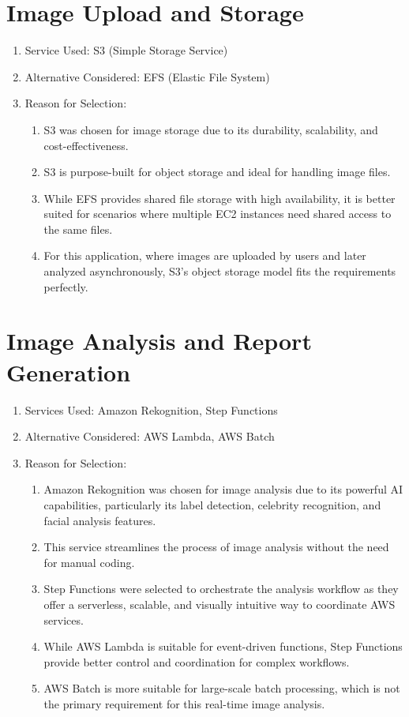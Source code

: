 \section{Image Upload and Storage}
\begin{enumerate}
    \item Service Used: S3 (Simple Storage Service)
    \item Alternative Considered: EFS (Elastic File System)
    \item Reason for Selection: 
    \begin{enumerate}
        \item S3 was chosen for image storage due to its durability, scalability, and cost-effectiveness. 
        \item S3 is purpose-built for object storage and ideal for handling image files. 
        \item  While EFS provides shared file storage with high availability, it is better suited for scenarios where multiple EC2 instances need shared access to the same files. 
        \item For this application, where images are uploaded by users and later analyzed asynchronously, S3's object storage model fits the requirements perfectly.
    \end{enumerate}
\end{enumerate}

\section{Image Analysis and Report Generation}
\begin{enumerate}
    \item Services Used: Amazon Rekognition, Step Functions
    \item  Alternative Considered: AWS Lambda, AWS Batch
    \item Reason for Selection: 
    \begin{enumerate}
        \item Amazon Rekognition was chosen for image analysis due to its powerful AI capabilities, particularly its label detection, celebrity recognition, and facial analysis features.
        \item This service streamlines the process of image analysis without the need for manual coding.
        \item Step Functions were selected to orchestrate the analysis workflow as they offer a serverless, scalable, and visually intuitive way to coordinate AWS services.
        \item While AWS Lambda is suitable for event-driven functions, Step Functions provide better control and coordination for complex workflows. 
        \item  AWS Batch is more suitable for large-scale batch processing, which is not the primary requirement for this real-time image analysis.
    \end{enumerate}
\end{enumerate}

